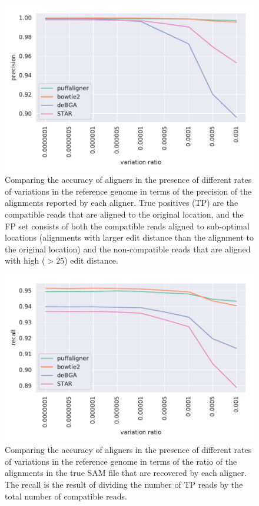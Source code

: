 \begin{figure}[H]
    \includegraphics[width=\textwidth,type=pdf,ext=.pdf,read=.pdf]{Figures/puff/DNAseq-sim-chr21-SV-prec}
    \caption[Accuracy of aligners in the presence of variations in the reference - precision]
    {Comparing the accuracy of aligners in the presence of different rates of variations in the reference genome
    in terms of the precision of the alignments reported by each aligner. 
    True positives (TP) are the compatible reads that are aligned to the original location, 
    and the FP set consists of both the compatible reads aligned to sub-optimal locations 
    (alignments with larger edit distance than the alignment to the original location) 
    and the non-compatible reads that are aligned with high ($>25$) edit distance.}
\end{figure}
\begin{figure}[H]
    \includegraphics[width=\textwidth,type=pdf,ext=.pdf,read=.pdf]{Figures/puff/DNAseq-sim-chr21-SV-recall}
    \caption[Accuracy of aligners in the presence of variations in the reference - recall]
    {Comparing the accuracy of aligners in the presence of different rates of variations in the reference genome
    in terms of the ratio of the alignments in the true SAM file that are recovered by each aligner. 
    The recall is the result of dividing the number of TP reads by the total number of compatible reads.}
    \label{fig:DNAseq-SV}
\end{figure}

